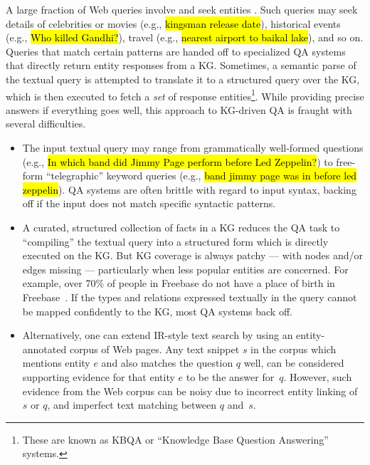 \documentclass{svjour3}
\DeclareRobustCommand{\query}[1]{{\sethlcolor{qcolor}\sffamily\hl{#1}}}
\begin{document}
A large fraction of Web queries involve and seek entities \citep{LinPGKF2012ActiveObjects}.  Such queries may seek details of celebrities or movies (e.g., \query{kingsman release date}), historical events (e.g., \query{Who killed Gandhi?}), travel (e.g., \query{nearest airport to baikal lake}), and so on.  Queries that match certain patterns are handed off to specialized QA systems that directly return entity responses from a KG.  Sometimes, a semantic parse of the textual query is attempted \citep{BerantCFL2013SEMPRE,YihCHG2015STAGG} to translate it to a structured query over the KG, which is then executed to fetch a \emph{set} of response entities\footnote{These are known as KBQA or ``Knowledge Base Question Answering'' systems.}.  While providing precise answers if everything goes well, this approach to KG-driven QA is fraught with several difficulties.

\begin{itemize}
\item The input textual query may range from grammatically well-formed questions (e.g., \query{In which band did Jimmy Page perform before Led Zeppelin?}) to free-form ``tele\-gra\-phic'' keyword queries (e.g., \query{band jimmy page was in before led zeppelin}).  QA systems are often brittle with regard to input syntax, backing off if the input does not match specific syntactic patterns.

\item A curated, structured collection of facts in a KG reduces the QA task to ``compiling'' the textual query into a structured form which is directly executed on the KG. But KG coverage is always patchy --- with nodes and/or edges missing --- particularly when less popular entities are concerned.  For example, over 70\% of people in Freebase do not have a place of birth in Freebase~\citep{WestGMSGL2014KBCviaQA}.  If the types and relations expressed textually in the query cannot be mapped confidently to the KG, most QA systems back off.

\item Alternatively, one can extend IR-style text search by using an entity-annotated corpus of Web pages.  Any text snippet $s$ in the corpus which mentions entity $e$ and also matches the question $q$ well, can be considered supporting evidence for that entity $e$ to be the answer for~$q$.  However, such evidence from the Web corpus can be noisy due to incorrect entity linking of $s$ or $q$, and imperfect text matching between $q$ and~$s$.
\end{itemize}
\end{document}
